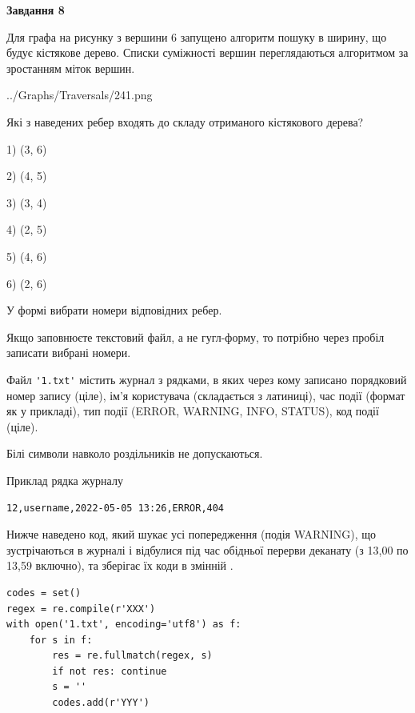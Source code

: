 \documentclass[12pt, ukrainian]{article}
\def\code#1{\Verb!#1!}
\begin{document}
{\begin {large}
{\begin {center}\textbf{Завдання 8}\end {center}}\par
Для графа на рисунку з вершини 6 запущено алгоритм пошуку в ширину, що будує кістякове дерево. Списки суміжності вершин переглядаються алгоритмом за зростанням міток вершин.\par
\begin{center}
	{../Graphs/Traversals/241.png}
\end{center}
\par Які з наведених ребер входять до складу отриманого кістякового дерева?\par
1) (3, 6)\par
2) (4, 5)\par
3) (3, 4)\par
4) (2, 5)\par
5) (4, 6)\par
6) (2, 6)\par
{\vskip 15pt} У формі вибрати номери відповідних ребер.


Якщо заповнюєте текстовий файл, а не гугл-форму, то потрібно через пробіл записа\-ти вибрані номери.\par
\newpage


Файл \code{'1.txt'} містить журнал з рядками, в яких через кому записано поряд\-ко\-вий номер запису (ціле), ім'я користувача (складається з латиниці), час події (фор\-мат як у прикладі), тип події (ERROR, WARNING, INFO, STATUS), код події (ціле).

Білі символи навколо роздільників не допускаються.

Приклад рядка журналу



\begin{verbatim}
12,username,2022-05-05 13:26,ERROR,404
\end{verbatim}


Нижче наведено код, який шукає усі попередження (подія WARNING), що зустрі\-ча\-ються в журналі і відбулися під час обідньої перерви деканату (з 13,00 по 13,59 включно), та зберігає їх коди в змінній .



\begin{verbatim}
codes = set()
regex = re.compile(r'XXX')
with open('1.txt', encoding='utf8') as f:
    for s in f:
        res = re.fullmatch(regex, s)
        if not res: continue
        s = ''
        codes.add(r'YYY')
\end{verbatim}





\end{large}}
\end{document}
